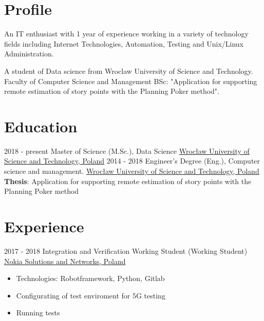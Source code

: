 \documentclass[letterpaper]{tenseconds} %
\begin{document}
\makeprofile %

\section{Profile}
\textnormal{\faInfo} An IT enthusiast with 1 year of experience working in a variety of technology fields including Internet Technologies, Automation, Testing and Unix/Linux Administration.

\textnormal{\faGraduationCap} A student of Data science from Wroclaw University of Science and Technology. Faculty of Computer Science and Management BSc: "Application for supporting remote estimation of
story points with the Planning Poker method". \vspace{2mm}

\section{Education}
\begin{twenty} %
	\twentyitem
	{2018 - present}
	{}
	{Master of Science (M.Sc.), Data Science}
	{\href{https://pwr.edu.pl/}{Wrocław University of Science and Technology, Poland}}
	{}
	{}
	\twentyitem
	{2014 - 2018}
	{}
	{Engineer's Degree (Eng.), Computer science and management.}
	{\href{https://pwr.edu.pl/}{Wrocław University of Science and Technology, Poland}}
	{}
	{
		\textbf{Thesis}:  Application for supporting remote estimation of story points with the Planning Poker method
	}
	{}
	{}
\end{twenty}

\section{Experience}
\begin{twenty} %
	\twentyitem
	{2017 - 2018}
	{}
	{Integration and Verification Working Student \textnormal{(Working Student)}}
	{\href{https://nokiawroclaw.pl/}{Nokia Solutions and Networks, Poland}}
	{}
	{\begin{itemize}
			\item Technologies: Robotframework, Python, Gitlab
			\item Configurating of test enviroment for 5G testing
			\item Running tests
		\end{itemize}}
\end{twenty}
\end{document}
